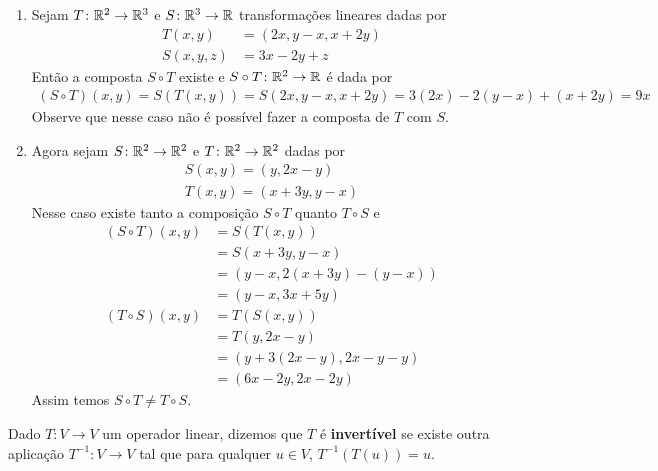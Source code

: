 \begin{exemplos}
  \begin{enumerate}
    \item Sejam $T \colon \mathbb{R}^2 \to \mathbb{R}^3$ e $S \colon \mathbb{R}^3 \to \mathbb{R}$ transformações lineares dadas por
      \begin{align*}
        T(x, y) &= (2x, y - x, x + 2y)\\
        S(x, y, z) &= 3x - 2y + z
      \end{align*}
      Então a composta $S \circ T$ existe e $S \circ T \colon \mathbb{R}^2 \to \mathbb{R}$ é dada por
      \begin{align*}
        (S \circ T)(x, y) = S(T(x, y)) = S(2x, y - x, x + 2y) = 3(2x) - 2(y - x) + (x + 2y) = 9x
      \end{align*}
      Observe que nesse caso não é possível fazer a composta de $T$ com $S$.

    \item Agora sejam $S \colon \mathbb{R}^2 \to \mathbb{R}^2$ e $T \colon \mathbb{R}^2 \to \mathbb{R}^2$ dadas por
      \begin{align*}
        S(x, y) = (y, 2x - y)\\
        T(x, y) = (x + 3y, y - x)
      \end{align*}
      Nesse caso existe tanto a composição $S \circ T$ quanto $T \circ S$ e
      \begin{align*}
        (S \circ T)(x, y) &= S(T(x, y)) \\ &= S(x + 3y, y - x) \\ &= (y - x, 2(x + 3y) - (y - x)) \\ &= (y - x, 3x + 5y)\\
        (T \circ S)(x, y) &= T(S(x, y)) \\ &= T(y, 2x - y) \\ &= (y + 3(2x - y), 2x - y - y) \\ &= (6x - 2y, 2x - 2y)
      \end{align*}
      Assim temos $S \circ T \ne T \circ S$.
  \end{enumerate}
\end{exemplos}

\begin{definicao}
  Dado $T \colon V \to V$ um operador linear,  dizemos que $T$ é \textbf{invertível} se existe outra aplicação $T^{-1} \colon V \to V$  tal que para qualquer $u \in V$,  $T^{-1}(T(u)) = u$.
\end{definicao}

